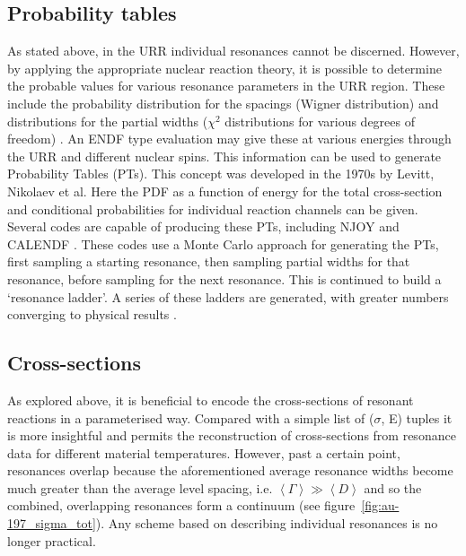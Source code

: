 \subsection{Probability tables}
\label{subsec:prob_table}
As stated above, in the URR individual resonances cannot be discerned. However, by applying the appropriate nuclear reaction theory, it is possible to determine the probable values for various resonance parameters in the URR region. These include the probability distribution for the spacings (Wigner distribution) and distributions for the partial widths ($\chi^{2}$ distributions for various degrees of freedom) \cite{MacFarlane2016}. An ENDF type evaluation may give these at various energies through the URR and different nuclear spins. This information can be used to generate Probability Tables (PTs). This concept was developed in the 1970s by Levitt, Nikolaev et al. Here the PDF as a function of energy for the total cross-section and conditional probabilities for individual reaction channels can be given. Several codes are capable of producing these PTs, including NJOY \cite{MacFarlane2010} and CALENDF \cite{sublet2017b}. These codes use a Monte Carlo approach for generating the PTs, first sampling a starting resonance, then sampling partial widths for that resonance, before sampling for the next resonance. This is continued to build a `resonance ladder'. A series of these ladders are generated, with greater numbers converging to physical results \cite{Brown2017}. 


\subsection{Cross-sections}
As explored above, it is beneficial to encode the cross-sections of resonant reactions in a parameterised way. Compared with a simple list of ($\sigma$, E) tuples it is more insightful and permits the reconstruction of cross-sections from resonance data for different material temperatures. However, past a certain point, resonances overlap because the aforementioned average resonance widths become much greater than the average level spacing, i.e. $\left<\Gamma\right> \gg \left<D\right>$ and so the combined, overlapping resonances form a continuum (see figure~\ref{fig:au-197_sigma_tot}). Any scheme based on describing individual resonances is no longer practical. 

